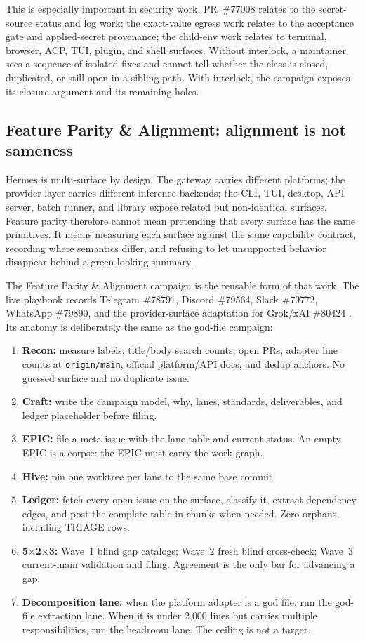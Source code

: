 \documentclass[11pt]{article}
\theoremstyle{definition}
\theoremstyle{plain}
\theoremstyle{remark}
\begin{document}
This is especially important in security work. PR~\#77008 relates to the
secret-source status and log work; the exact-value egress work relates to the
acceptance gate and applied-secret provenance; the child-env work relates to
terminal, browser, ACP, TUI, plugin, and shell surfaces. Without interlock,
a maintainer sees a sequence of isolated fixes and cannot tell whether the
class is closed, duplicated, or still open in a sibling path. With interlock,
the campaign exposes its closure argument and its remaining holes.

\subsection{Feature Parity \& Alignment: alignment is not sameness}
\label{sec:feature-parity}

Hermes is multi-surface by design. The gateway carries different platforms;
the provider layer carries different inference backends; the CLI, TUI,
desktop, API server, batch runner, and library expose related but non-identical
surfaces. Feature parity therefore cannot mean pretending that every surface
has the same primitives. It means measuring each surface against the same
capability contract, recording where semantics differ, and refusing to let
unsupported behavior disappear behind a green-looking summary.

The Feature Parity \& Alignment campaign is the reusable form of that work.
The live playbook records Telegram \#78791, Discord \#79564, Slack \#79772,
WhatsApp \#79890, and the provider-surface adaptation for Grok/xAI
\#80424 \citep{hermespr79898}. Its anatomy is deliberately the same as the
god-file campaign:

\begin{enumerate}[leftmargin=*]
\item \textbf{Recon:} measure labels, title/body search counts, open PRs,
adapter line counts at \texttt{origin/main}, official platform/API docs, and
dedup anchors. No guessed surface and no duplicate issue.
\item \textbf{Craft:} write the campaign model, why, lanes, standards,
deliverables, and ledger placeholder before filing.
\item \textbf{EPIC:} file a meta-issue with the lane table and current status.
An empty EPIC is a corpse; the EPIC must carry the work graph.
\item \textbf{Hive:} pin one worktree per lane to the same base commit.
\item \textbf{Ledger:} fetch every open issue on the surface, classify it,
extract dependency edges, and post the complete table in chunks when needed.
Zero orphans, including TRIAGE rows.
\item \textbf{5$\times$2$\times$3:} Wave~1 blind gap catalogs; Wave~2 fresh
blind cross-check; Wave~3 current-main validation and filing. Agreement is the
only bar for advancing a gap.
\item \textbf{Decomposition lane:} when the platform adapter is a god file,
run the god-file extraction lane. When it is under 2{,}000 lines but carries
multiple responsibilities, run the headroom lane. The ceiling is not a target.
\end{enumerate}
\end{document}

